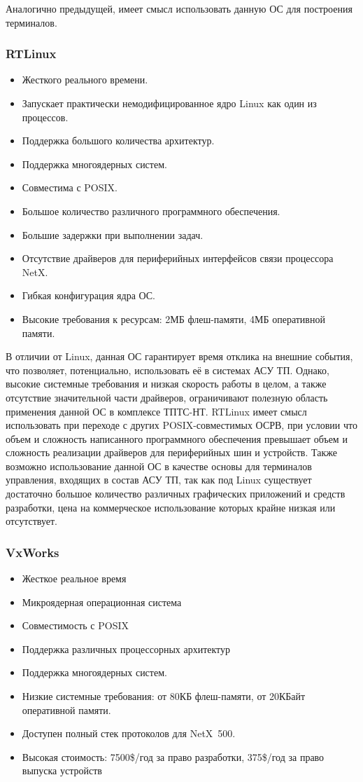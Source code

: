 \documentclass[a4paper,14pt,bachelor]{disser}
\begin{document}
Аналогично предыдущей, имеет смысл использовать данную ОС для построения терминалов.

\subsubsection{RTLinux}
\begin{itemize}
 \item Жесткого реального времени.
 \item Запускает практически немодифицированное ядро Linux как один из процессов.
 \item Поддержка большого количества архитектур.
 \item Поддержка многоядерных систем.
 \item Совместима с POSIX.
 \item Большое количество различного программного обеспечения.
 \item Большие задержки при выполнении задач.
 \item Отсутствие драйверов для периферийных интерфейсов связи процессора NetX.
 \item Гибкая конфигурация ядра ОС.
 \item Высокие требования к ресурсам: 2МБ флеш-памяти, 4МБ оперативной памяти.
\end{itemize}

В отличии от Linux, данная ОС гарантирует время отклика на внешние события, что позволяет, потенциально, использовать её в системах АСУ ТП. Однако, высокие системные требования и низкая скорость работы в целом, а также отсутствие значительной части драйверов, ограничивают полезную область применения данной ОС в комплексе ТПТС-НТ. RTLinux имеет смысл использовать при переходе с других POSIX-совместимых ОСРВ, при условии что объем и сложность написанного программного обеспечения превышает объем и сложность реализации драйверов для периферийных шин и устройств. Также возможно использование данной ОС в качестве основы для терминалов управления, входящих в состав АСУ ТП, так как под Linux существует достаточно большое количество различных графических приложений и средств разработки, цена на коммерческое использование которых крайне низкая или отсутствует.

\subsubsection{VxWorks}
\begin{itemize}
 \item Жесткое реальное время
 \item Микроядерная операционная система
 \item Совместимость с POSIX
 \item Поддержка различных процессорных архитектур
 \item Поддержка многоядерных систем.
 \item Низкие системные требования: от 80КБ флеш-памяти, от 20КБайт оперативной памяти.
 \item Доступен полный стек протоколов для NetX~500.
 \item Высокая стоимость: 7500\$/год за право разработки, 375\$/год за право выпуска устройств
\end{itemize}
\end{document}
